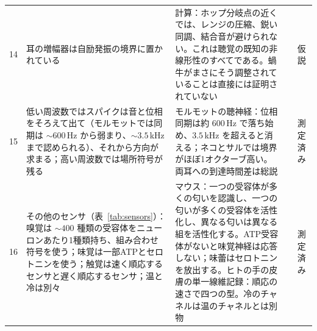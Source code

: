 {\begin{longtable}{>{\raggedright}p{0.5cm}>{\raggedright}p{4.0cm}>{\raggedright}p{5.6cm}>{\raggedright}p{2.3cm}>{\raggedright\arraybackslash}p{1.7cm}}
14 & 耳の増幅器は自励発振の境界に置かれている & 計算：ホップ分岐点の近くでは、レンジの圧縮、鋭い同調、結合音が避けられない。これは聴覚の既知の非線形性のすべてである。蝸牛がまさにそう調整されていることは直接には証明されていない & \cite{Eguiluz2000} & 仮説 \\
15 & 低い周波数ではスパイクは音と位相をそろえて出て（モルモットでは同期は $\sim600$\,Hz から弱まり、$\sim3.5$\,kHz まで認められる）、それから方向が求まる；高い周波数では場所符号が残る & モルモットの聴神経：位相同期は約 $600$\,Hz で落ち始め、$3.5$\,kHz を超えると消える；ネコとサルでは境界がほぼ1オクターブ高い。両耳への到達時間差は総説 & \cite{PalmerRussell1986,Grothe2010} & 測定済み \\
16 & その他のセンサ（表~\ref{tab:sensors}）：嗅覚は $\sim400$ 種類の受容体をニューロンあたり1種類持ち、組み合わせ符号を使う；味覚は一部ATPとセロトニンを使う；触覚は速く順応するセンサと遅く順応するセンサ；温と冷は別々 & マウス：一つの受容体が多くの匂いを認識し、一つの匂いが多くの受容体を活性化し、異なる匂いは異なる組を活性化する。ATP受容体がないと味覚神経は応答しない；味蕾はセロトニンを放出する。ヒトの手の皮膚の単一線維記録：順応の速さで四つの型。冷のチャネルは温のチャネルとは別物 & \cite{Mombaerts2004,Malnic1999,Finger2005,Huang2005,JohanssonVallbo1979,McKemy2002} & 測定済み \\
\bottomrule
\end{longtable}}
